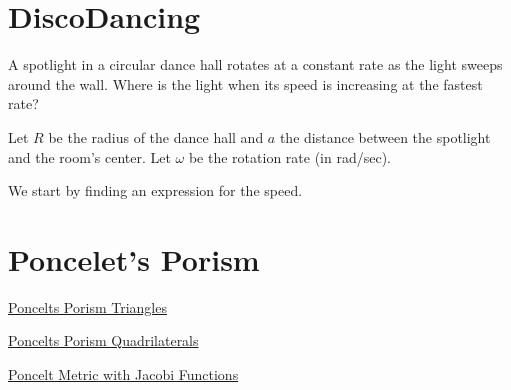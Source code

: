 \documentclass{ximera}
\begin{document}
\section*{DiscoDancing}

A spotlight in a circular dance hall rotates at a constant rate as the light sweeps around the wall. Where is the light when its speed is increasing at the fastest rate?

Let $R$ be the radius of the dance hall and $a$ the distance between the spotlight and the room's center. Let $\omega$ be the rotation rate (in rad/sec).

We start by finding an expression for the speed.



\section*{Poncelet's Porism}


\begin{exploration}

\begin{onlineOnly}
    \begin{center}
\end{center}
\end{onlineOnly}

\href{https://www.desmos.com/calculator/0aihemcv0o}{Poncelts Porism Triangles}

\end{exploration}


\begin{exploration}

\begin{onlineOnly}
    \begin{center}
\end{center}
\end{onlineOnly}

\href{https://www.desmos.com/calculator/pua4ogjcmr}{Poncelts Porism Quadrilaterals}


\end{exploration}



\begin{onlineOnly}
    \begin{center}
\end{center}
\end{onlineOnly}

\href{https://www.desmos.com/calculator/q16ify3gtm}{Poncelt Metric with Jacobi Functions}
\end{document}
